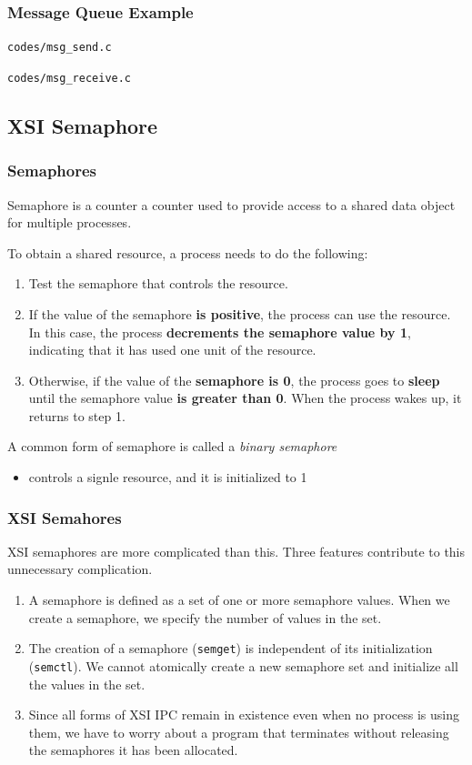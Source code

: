 \documentclass[newPxFont,sthlmFooter,nooffset]{beamer}
\begin{document}
\begin{frame}
  \frametitle{Message Queue Example}
\bigskip
\texttt{codes/msg\_send.c}
  

\newpage
\bigskip
\texttt{codes/msg\_receive.c}
  
\end{frame}

\subsection{XSI Semaphore}

\begin{frame}[t]
  \frametitle{Semaphores}
Semaphore is a counter a counter used to provide access to a shared data object for multiple processes.

To obtain a shared resource, a process needs to do the following:
\begin{enumerate}
\item Test the semaphore that controls the resource.
\item If the value of the semaphore \textbf{is positive}, the process can use the resource. In this case, the process \textbf{decrements the semaphore value by 1}, indicating that it has used one unit of the resource.
\item Otherwise, if the value of the \textbf{semaphore is 0}, the process goes to \textbf{sleep} until the semaphore value \textbf{is greater than 0}. When the process wakes up, it returns to step 1.
\end{enumerate}
A common form of semaphore is called a \textit{binary semaphore}
\begin{itemize}
\item controls a signle resource, and it is initialized to 1
\end{itemize}

\end{frame}



\begin{frame}[t]
  \frametitle{XSI Semahores}
XSI semaphores are more complicated than this. Three features contribute to this unnecessary complication.
\begin{enumerate}
\item A semaphore is defined as a set of one or more semaphore values. When we create a semaphore, we specify the number of values in the set.
\item The creation of a semaphore (\texttt{semget}) is independent of its initialization (\texttt{semctl}).  We cannot atomically create a new semaphore set and initialize all the values in the set.
\item Since all forms of XSI IPC remain in existence even when no process is using them, we have to worry about a program that terminates without releasing the semaphores it has been allocated. 
\end{enumerate}
\end{frame}
\end{document}
